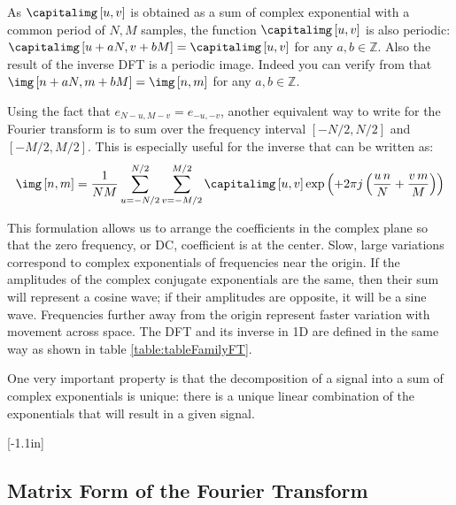As $\capitalimg \left[u,v \right]$ is obtained as a sum of complex exponential with a common period of $N,M$ samples, the function  $\capitalimg \left[u,v \right]$  is also periodic: $\capitalimg \left[u+aN,v+bM \right] = \capitalimg \left[u,v \right]$ for any $a,b \in \mathbb{Z}$.
Also the result of the inverse DFT is a periodic image. Indeed you can verify from \eqn{\ref{eq:inversefourier}} that $\img \left[n+aN,m+bM \right] = \img \left[n,m \right]$ for any $a,b \in \mathbb{Z}$. 



Using the fact that $e_{N-u, M-v} = e_{-u,-v}$, another equivalent way to write for the Fourier transform is to sum over the frequency interval $\left[-N/2, N/2\right]$ and $\left[-M/2, M/2\right]$. This is especially useful for the inverse that can be written as:
\begin{equation}
\img \left[n,m \right] = \frac{1}{NM} \sum_{u=-N/2}^{N/2} \sum_{v=-M/2}^{M/2} \capitalimg \left[u,v \right] 
\exp{ \left(+2\pi j \left(\frac{u\, n}{N} + \frac{v\, m}{M} \right) \right) }
\label{eq:inversefourier2}
\end{equation}

This formulation allows us to arrange the coefficients in the complex plane so that the zero frequency, or DC, coefficient is at the center.  Slow, large variations correspond to complex exponentials of
frequencies near the origin.   If the amplitudes of the complex conjugate exponentials are the same, then their sum will represent a cosine wave;  if their amplitudes are opposite, it will be a sine
wave.  Frequencies further away from the origin represent faster
variation with movement across space. The DFT and its inverse in 1D are defined in the same way as shown in table \ref{table:tableFamilyFT}. 


One very important property is that the decomposition of a signal into a sum of complex exponentials is unique: there is a unique linear combination of the exponentials that will result in a given signal. 

[-1.1in]

\subsection{Matrix Form of the Fourier Transform}



